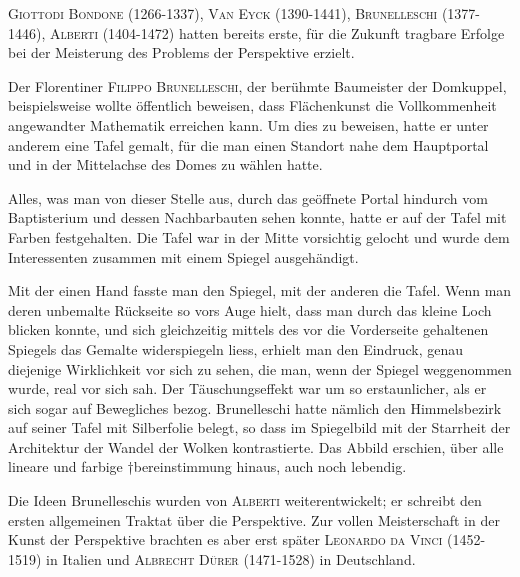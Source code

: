 \documentclass[%
11pt,%
twoside,%
titlepage,%
a4page,%
german,%
headsepline%
]{scrartcl}
\begin{document}
\textsc{Giottodi Bondone} (1266-1337), \textsc{Van Eyck} (1390-1441), \textsc{Brunelleschi} (1377-1446), \textsc{Alberti} (1404-1472) hatten bereits erste, f\"ur die Zukunft tragbare Erfolge bei der Meisterung des Problems der Perspektive erzielt.

Der Florentiner \textsc{Filippo Brunelleschi}, der ber\"uhmte Baumeister der Domkuppel, beispielsweise wollte \"offentlich beweisen, dass Fl\"achenkunst die Vollkommenheit angewandter Mathematik erreichen kann. Um dies zu beweisen, hatte er unter anderem eine Tafel gemalt, f\"ur die man einen Standort nahe dem Hauptportal und in der Mittelachse des Domes zu w\"ahlen hatte.

Alles, was man von dieser Stelle aus, durch das ge\"offnete Portal hindurch vom Baptisterium und dessen Nachbarbauten sehen konnte, hatte er auf der Tafel mit Farben festgehalten. Die Tafel war in der Mitte vorsichtig gelocht und wurde dem Interessenten zusammen mit einem Spiegel ausgeh\"andigt.

Mit der einen Hand fasste man den Spiegel, mit der anderen die Tafel. Wenn man deren unbemalte R\"uckseite so vors Auge hielt, dass man durch das kleine Loch blicken konnte, und sich gleichzeitig mittels des vor die Vorderseite gehaltenen Spiegels das Gemalte widerspiegeln liess, erhielt man den Eindruck, genau diejenige Wirklichkeit vor
sich zu sehen, die man, wenn der
Spiegel weggenommen wurde, real vor sich sah. Der T\"auschungseffekt war um so erstaunlicher, als er sich sogar auf Bewegliches bezog. Brunelleschi hatte n\"amlich den Himmelsbezirk auf seiner Tafel mit Silberfolie belegt, so dass im Spiegelbild mit der Starrheit der Architektur der Wandel der Wolken kontrastierte. Das Abbild erschien, \"uber alle lineare und farbige †bereinstimmung hinaus, auch noch lebendig.

Die Ideen Brunelleschis wurden von \textsc{Alberti} weiterentwickelt; er schreibt den ersten allgemeinen Traktat \"uber die Perspektive. Zur vollen Meisterschaft in der Kunst der Perspektive brachten es aber erst sp\"ater \textsc{Leonardo da Vinci} (1452- 1519) in Italien und \textsc{Albrecht D\"urer} (1471-1528) in Deutschland.
\end{document}
